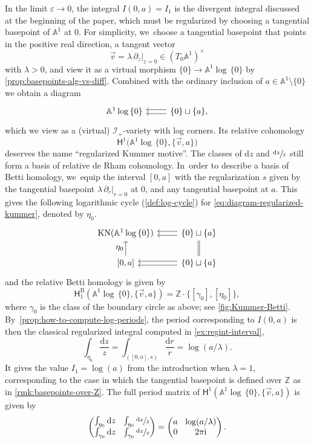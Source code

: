 \documentclass[10pt]{amsart}
\let\oldbullet\bullet
\renewcommand{\bullet}{{\raisebox{1pt}{$\scriptscriptstyle\oldbullet$}}}
\let\tst\textstyle
\newcommand{\rbirac}[1]{\bigl(#1\bigr)}
\newcommand{\cbirac}[1]{\bigl\{#1\bigr\}}
\newcommand{\bcoH}[2][\bullet]{\mathsf{H}^{#1}\rbirac{#2}}
\newcommand{\dslog}[1]{\sfrac{\dd#1}{#1}}
\theoremstyle{definition}
\theoremstyle{remark}
\newcommand{\ZZ}{\mathbb{Z}}
\newcommand{\AF}{\mathbb{A}}
\newcommand{\logcyl}{\AF^1 \log\, \{0\}}
\newcommand{\iu}{\mathrm{i}}
\newcommand{\ipi}{\pi\iu }
\newcommand{\tipi}{2\ipi}
\let\epsilon\varepsilon
\newcommand{\rbrac}[1]{\left(#1\right)}
\newcommand{\dd}{\mathrm{d}}
\newcommand{\dlog}[1]{\frac{\dd#1}{#1}}
\newcommand{\cvf}[1]{\partial_{#1}}
\newcommand{\tb}[2][]{T_{#1}#2}
\newcommand{\KN}[1]{\mathrm{KN}(#1)}
\newcommand{\coH}[2][\bullet]{\mathsf{H}^{#1}\rbrac{#2}}
\newcommand{\HlgyB}[2][\bullet]{\mathsf{H}^{\mathrm{B}}_{#1}(#2)}
\newcommand{\ascat}{\mathscr{I}_+}
\begin{document}
In the limit $\epsilon \to 0$, the integral $I(0,a)=I_1$ is the divergent integral discussed at the beginning of the paper, which must be regularized by choosing a tangential basepoint of $\AF^1$ at $0$. For simplicity, we~choose a tangential basepoint that points in the positive real direction, \ie a tangent vector
\[
\vec{v} = \lambda \, \cvf{z}|_{z=0} \in (\tb[0]{\AF^1})^\times
\]
with $\lambda > 0$, and view it as a virtual morphism $\{0\}\to \logcyl$ by \autoref{prop:basepoints-alg-vs-diff}. Combined with the ordinary inclusion of $a \in \AF^1 \setminus \{0\}$ we obtain a diagram
\begin{equation}\label{eq:diagram-regularized-kummer}
\begin{tikzcd}
\logcyl & \{0\} \sqcup \{a\} \ar[l,shift right] \ar[l,shift left],
\end{tikzcd}
\end{equation}
which we view as a (virtual) $\ascat$-variety with log corners. Its relative cohomology
\[
\bcoH[1]{\logcyl,\{\vec{v},a\}}
\]
deserves the name ``regularized Kummer motive''.
The classes of $\dd z$ and $\dslog{z}$ still form a basis of relative de Rham cohomology. In~order to describe a basis of Betti homology, we~equip the interval $[0,a]$ with the regularization $s$ given by the tangential basepoint $\lambda \, \cvf{r}|_{r=0}$ at $0$, and any tangential basepoint at $a$. This gives the following logarithmic cycle (\autoref{def:log-cycle}) for \eqref{eq:diagram-regularized-kummer}, denoted by $\eta_0$.
\[
\begin{tikzcd}
\KN{\logcyl} & \{0\} \sqcup \{a\} \ar[l,shift right] \ar[l,shift left] \\
{[0,a]} \ar[u,"\tst \eta_0"] & \{0\} \sqcup \{a\} \ar[u,equal] \ar[l,shift right] \ar[l,shift left]
\end{tikzcd}
\]
and the relative Betti homology is given by
\[
\HlgyB[1]{\logcyl,\{\vec{v},a\}} = \ZZ \cdot \cbirac{[\gamma_0],[\eta_0]},
\]
where $\gamma_0$ is the class of the boundary circle as above; see \autoref{fig:Kummer-Betti}. By~\autoref{prop:how-to-compute-log-periods}, the period corresponding to $I(0,a)$ is then the classical regularized integral computed in \autoref{ex:regint-interval},
\[
\int_{\eta_0}\dlog{z} = \int_{([0,a],s)}\dlog{r} = \log(a/\lambda).
\]
It gives the value $I_1 = \log(a)$ from the introduction when $\lambda=1$, corresponding to the case in which the tangential basepoint is defined over $\ZZ$ as in \autoref{rmk:basepoints-over-Z}. The full period matrix of $\coH[1]{\logcyl,\{\vec{v},a\}}$ is given by
\[\arraycolsep4.5pt
\begin{pmatrix}
\int_{\eta_0} \dd z & \int_{\eta_0} \dslog{z} \\
\int_{\gamma_0} \dd z & \int_{\gamma_0} \dslog{z}
\end{pmatrix} = \begin{pmatrix}
a & \log(a/\lambda)\\
0 & \tipi
\end{pmatrix}.
\]
\end{document}
